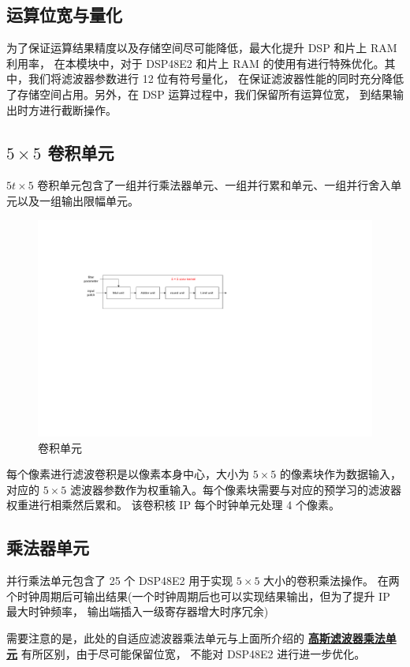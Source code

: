 \documentclass[12pt, a4paper, oneside]{ctexbook}
\begin{document}
	\subsection{运算位宽与量化}
	为了保证运算结果精度以及存储空间尽可能降低，最大化提升 DSP 和片上 RAM 利用率，
	在本模块中，对于 DSP48E2 和片上 RAM 的使用有进行特殊优化。其中，我们将滤波器参数进行 12 位有符号量化，
	在保证滤波器性能的同时充分降低了存储空间占用。另外，在 DSP 运算过程中，我们保留所有运算位宽，
	到结果输出时方进行截断操作。
	\subsection{$5\times5$ 卷积单元}
	$5t\times5$ 卷积单元包含了一组并行乘法器单元、一组并行累和单元、一组并行舍入单元以及一组输出限幅单元。
		\begin{figure}[h]
		\centering
		\includegraphics[scale=0.7]{pic/conv.pdf}
		\caption{卷积单元}
		\end{figure}	
	每个像素进行滤波卷积是以像素本身中心，大小为 $5\times5$ 的像素块作为数据输入，
	对应的 $5\times5$ 滤波器参数作为权重输入。每个像素块需要与对应的预学习的滤波器权重进行相乘然后累和。
	该卷积核 IP 每个时钟单元处理 4 个像素。
	\subsection{乘法器单元}
	并行乘法单元包含了 25 个 DSP48E2 用于实现 $5\times5$ 大小的卷积乘法操作。
	在两个时钟周期后可输出结果(一个时钟周期后也可以实现结果输出，但为了提升 IP 最大时钟频率，
	输出端插入一级寄存器增大时序冗余) \par 需要注意的是，此处的自适应滤波器乘法单元与上面所介绍的 
	\hyperref[mul_unit]{\textbf{高斯滤波器乘法单元}} 有所区别，由于尽可能保留位宽，
	不能对 DSP48E2 进行进一步优化。%
\end{document}
